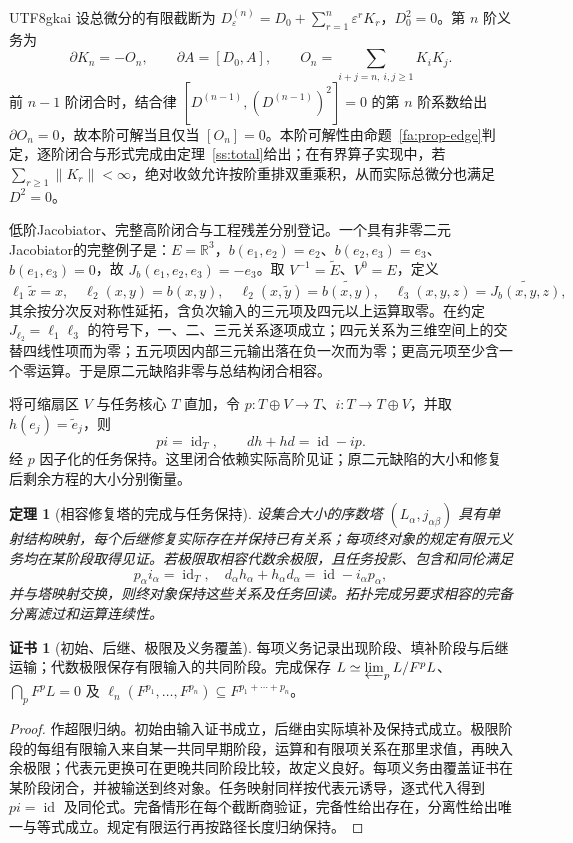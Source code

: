\documentclass[11pt,a4paper]{article}
\theoremstyle{plain}
\newtheorem{theorem}{定理}[section]
\theoremstyle{definition}
\newtheorem*{certificate}{证书}
\theoremstyle{remark}
\begin{document}
\begin{CJK*}{UTF8}{gkai}
设总微分的有限截断为 $D_\varepsilon^{(n)}=D_0+\sum_{r=1}^n\varepsilon^rK_r$，$D_0^2=0$。第 $n$ 阶义务为
\[
 \partial K_n=-O_n,\qquad
 \partial A=[D_0,A],\qquad
 O_n=\sum_{i+j=n,\ i,j\ge1}K_iK_j.
\]
前 $n-1$ 阶闭合时，结合律 $[D^{(n-1)},(D^{(n-1)})^2]=0$ 的第 $n$ 阶系数给出 $\partial O_n=0$，故本阶可解当且仅当 $[O_n]=0$。本阶可解性由命题~\ref{fa:prop-edge}判定，逐阶闭合与形式完成由定理~\ref{ss:total}给出；在有界算子实现中，若 $\sum_{r\ge1}\|K_r\|<\infty$，绝对收敛允许按阶重排双重乘积，从而实际总微分也满足 $D^2=0$。

低阶Jacobiator、完整高阶闭合与工程残差分别登记。一个具有非零二元Jacobiator的完整例子是：$E=\mathbb R^3$，$b(e_1,e_2)=e_2$、$b(e_2,e_3)=e_3$、$b(e_1,e_3)=0$，故 $J_b(e_1,e_2,e_3)=-e_3$。取 $V^{-1}=\widetilde E$、$V^0=E$，定义
\[
 \ell_1\widetilde x=x,\quad \ell_2(x,y)=b(x,y),\quad
 \ell_2(x,\widetilde y)=\widetilde{b(x,y)},\quad
 \ell_3(x,y,z)=\widetilde{J_b(x,y,z)},
\]
其余按分次反对称性延拓，含负次输入的三元项及四元以上运算取零。在约定 $J_{\ell_2}=\ell_1\ell_3$ 的符号下，一、二、三元关系逐项成立；四元关系为三维空间上的交替四线性项而为零；五元项因内部三元输出落在负一次而为零；更高元项至少含一个零运算。于是原二元缺陷非零与总结构闭合相容。

将可缩扇区 $V$ 与任务核心 $T$ 直加，令 $p:T\oplus V\to T$、$i:T\to T\oplus V$，并取 $h(e_j)=\widetilde e_j$，则
\[
 pi=\operatorname{id}_T,\qquad dh+hd=\operatorname{id}-ip.
\]
经 $p$ 因子化的任务保持。这里闭合依赖实际高阶见证；原二元缺陷的大小和修复后剩余方程的大小分别衡量。

\begin{theorem}[相容修复塔的完成与任务保持]
\label{pc:transfinite}
设集合大小的序数塔 $(L_\alpha,j_{\alpha\beta})$ 具有单射结构映射，每个后继修复实际存在并保持已有关系；每项终对象的规定有限元义务均在某阶段取得见证。若极限取相容代数余极限，且任务投影、包含和同伦满足
\[
 p_\alpha i_\alpha=\operatorname{id}_T,\quad
 d_\alpha h_\alpha+h_\alpha d_\alpha=\operatorname{id}-i_\alpha p_\alpha,
\]
并与塔映射交换，则终对象保持这些关系及任务回读。拓扑完成另要求相容的完备分离滤过和运算连续性。
\end{theorem}
\begin{certificate}[初始、后继、极限及义务覆盖]
每项义务记录出现阶段、填补阶段与后继运输；代数极限保存有限输入的共同阶段。完成保存 $L\simeq\varprojlim_pL/F^pL$、$\bigcap_pF^pL=0$ 及
$\ell_n(F^{p_1},\ldots,F^{p_n})\subseteq F^{p_1+\cdots+p_n}$。
\end{certificate}
\begin{proof}
作超限归纳。初始由输入证书成立，后继由实际填补及保持式成立。极限阶段的每组有限输入来自某一共同早期阶段，运算和有限项关系在那里求值，再映入余极限；代表元更换可在更晚共同阶段比较，故定义良好。每项义务由覆盖证书在某阶段闭合，并被输送到终对象。任务映射同样按代表元诱导，逐式代入得到 $pi=\operatorname{id}$ 及同伦式。完备情形在每个截断商验证，完备性给出存在，分离性给出唯一与等式成立。规定有限运行再按路径长度归纳保持。
\end{proof}


\end{CJK*}
\end{document}
